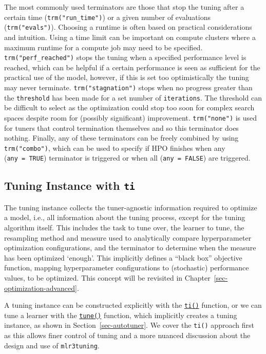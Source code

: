 The most commonly used terminators are those that stop the tuning after
a certain time (\texttt{trm("run\_time")}) or a given number of
evaluations (\texttt{trm("evals")}). Choosing a runtime is often based
on practical considerations and intuition. Using a time limit can be
important on compute clusters where a maximum runtime for a compute job
may need to be specified. \texttt{trm("perf\_reached")} stops the tuning
when a specified performance level is reached, which can be helpful if a
certain performance is seen as sufficient for the practical use of the
model, however, if this is set too optimistically the tuning may never
terminate. \texttt{trm("stagnation")} stops when no progress greater
than the \texttt{threshold} has been made for a set number of
\texttt{iterations}. The threshold can be difficult to select as the
optimization could stop too soon for complex search spaces despite room
for (possibly significant) improvement. \texttt{trm("none")} is used for
tuners that control termination themselves and so this terminator does
nothing. Finally, any of these terminators can be freely combined by
using \texttt{trm("combo")}, which can be used to specify if HPO
finishes when any (\texttt{any\ =\ TRUE}) terminator is triggered or
when all (\texttt{any\ =\ FALSE}) are triggered.

\hypertarget{sec-tuning-instance}{%
\subsection{\texorpdfstring{Tuning Instance with
\texttt{ti}}{Tuning Instance with ti}}\label{sec-tuning-instance}}

The tuning instance collects the tuner-agnostic information required to
optimize a model, i.e., all information about the tuning process, except
for the tuning algorithm itself. This includes the task to tune over,
the learner to tune, the resampling method and measure used to
analytically compare hyperparameter optimization configurations, and the
terminator to determine when the measure has been optimized `enough'.
This implicitly defines a ``black box'' objective function, mapping
hyperparameter configurations to (stochastic) performance values, to be
optimized. This concept will be revisited in
Chapter~\ref{sec-optimization-advanced}.

A tuning instance can be constructed explicitly
with the
\href{https://mlr3tuning.mlr-org.com/reference/ti.html}{\texttt{ti()}}
function, or we can tune a learner with the
\href{https://mlr3tuning.mlr-org.com/reference/tune.html}{\texttt{tune()}}
function, which implicitly creates a tuning instance, as shown in
Section~\ref{sec-autotuner}. We cover the \texttt{ti()} approach first
as this allows finer control of tuning and a more nuanced discussion
about the design and use of \texttt{mlr3tuning}.

